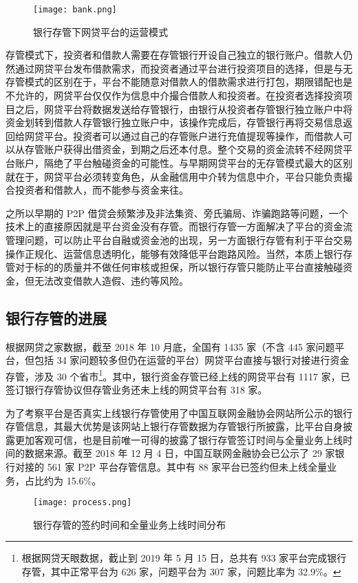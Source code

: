 \documentclass[lang=cn,11pt]{elegantpaper}
\begin{document}
\begin{figure}
\centering
\texttt{[image: bank.png]}
\caption{银行存管下网贷平台的运营模式\label{fig:bank}}
\end{figure}

存管模式下，投资者和借款人需要在存管银行开设自己独立的银行账户。借款人仍然通过网贷平台发布借款需求，而投资者通过平台进行投资项目的选择，但是与无存管模式的区别在于，平台不能随意对借款人的借款需求进行打包，期限错配也是不允许的，网贷平台仅仅作为信息中介撮合借款人和投资者。在投资者选择投资项目之后，网贷平台将数据发送给存管银行，由银行从投资者存管银行独立账户中将资金划转到借款人存管银行独立账户中，该操作完成后，存管银行再将交易信息返回给网贷平台。投资者可以通过自己的存管账户进行充值提现等操作，而借款人可以从存管账户获得出借资金，到期之后还本付息。整个交易的资金流转不经网贷平台账户，隔绝了平台触碰资金的可能性。与早期网贷平台的无存管模式最大的区别就在于，网贷平台必须转变角色，从金融信用中介转为信息中介，平台只能负责撮合投资者和借款人，而不能参与资金来往。

之所以早期的 P2P 借贷会频繁涉及非法集资、旁氏骗局、诈骗跑路等问题，一个技术上的直接原因就是平台资金没有存管。而银行存管一方面解决了平台的资金流管理问题，可以防止平台自融或资金池的出现，另一方面银行存管有利于平台交易操作正规化、运营信息透明化，能够有效降低平台跑路风险。当然，本质上银行存管对于标的的质量并不做任何审核或担保，所以银行存管只能防止平台直接触碰资金，但无法改变借款人造假、违约等风险。

\subsection{银行存管的进展}
根据网贷之家数据，截至 2018 年 10 月底，全国有 1435 家（不含 445 家问题平台，但包括 34 家问题较多但仍在运营的平台）网贷平台直接与银行对接进行资金存管，涉及 30 个省市\footnote{根据网贷天眼数据，截止到 2019 年 5 月 15 日，总共有 933 家平台完成银行存管，其中正常平台为 626 家，问题平台为 307 家，问题比率为 32.9\%。}。其中，银行资金存管已经上线的网贷平台有 1117 家，已签订银行存管协议但存管业务还未上线的网贷平台有 318 家。

为了考察平台是否真实上线银行存管使用了中国互联网金融协会网站所公示的银行存管信息，其最大优势是该网站上银行存管数据为存管银行所披露，比平台自身披露更加客观可信，也是目前唯一可得的披露了银行存管签订时间与全量业务上线时间的数据来源。截至 2018 年 12 月 4 日，中国互联网金融协会已公示了 29 家银行对接的 561 家 P2P 平台存管信息。其中有 88 家平台已签约但未上线全量业务，占比约为 15.6\%。

\begin{figure}
\centering
\texttt{[image: process.png]}
\caption{银行存管的签约时间和全量业务上线时间分布\label{fig:process}}
\end{figure}
\end{document}
